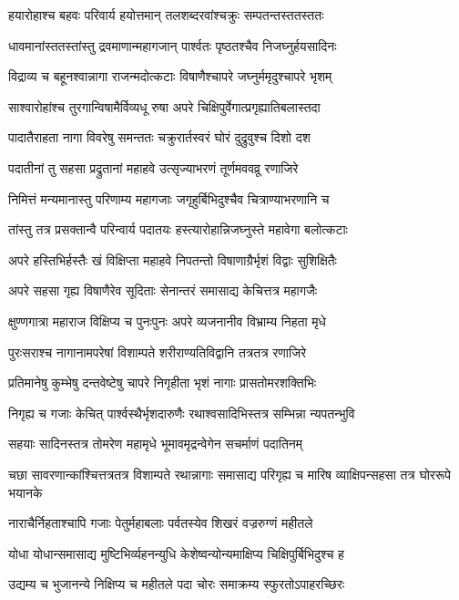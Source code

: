 \twolineshloka
{हयारोहाश्च बहवः परिवार्य हयोत्तमान्}
{तलशब्दरवांश्चक्रुः सम्पतन्तस्ततस्ततः}


\twolineshloka
{धावमानांस्ततस्तांस्तु द्रवमाणान्महागजान्}
{पार्श्वतः पृष्ठतश्चैव निजघ्नुर्हयसादिनः}


\twolineshloka
{विद्राव्य च बहूनश्वान्नागा राजन्मदोत्कटाः}
{विषाणैश्चापरे जघ्नुर्ममृदुश्चापरे भृशम्}


\twolineshloka
{साश्वारोहांश्च तुरगान्विषामैर्विव्यधू रुषा}
{अपरे चिक्षिपुर्वेगात्प्रगृह्यातिबलास्तदा}


\twolineshloka
{पादातैराहता नागा विवरेषु समन्ततः}
{चक्रुरार्तस्वरं घोरं दुद्रुवुश्च दिशो दश}


\twolineshloka
{पदातीनां तु सहसा प्रद्रुतानां महाहवे}
{उत्सृज्याभरणं तूर्णमववव्रू रणाजिरे}


\twolineshloka
{निमित्तं मन्यमानास्तु परिणाम्य महागजाः}
{जगृहुर्बिभिदुश्चैव चित्राण्याभरणानि च}


\twolineshloka
{तांस्तु तत्र प्रसक्तान्वै परिन्वार्य पदातयः}
{हस्त्यारोहान्निजघ्नुस्ते महावेगा बलोत्कटाः}


\twolineshloka
{अपरे हस्तिभिर्हस्तैः खं विक्षिप्ता महाहवे}
{निपतन्तो विषाणाग्रैर्भृशं विद्वाः सुशिक्षितैः}


\twolineshloka
{अपरे सहसा गृह्य विषाणैरेव सूदिताः}
{सेनान्तरं समासाद्य केचित्तत्र महागजैः}


\twolineshloka
{क्षुण्णगात्रा महाराज विक्षिप्य च पुनःपुनः}
{अपरे व्यजनानीव विभ्राम्य निहता मृधे}


\twolineshloka
{पुरःसराश्च नागानामपरेषां विशाम्पते}
{शरीराण्यतिविद्वानि तत्रतत्र रणाजिरे}


\twolineshloka
{प्रतिमानेषु कुम्भेषु दन्तवेष्टेषु चापरे}
{निगृहीता भृशं नागाः प्रासतोमरशक्तिभिः}


\twolineshloka
{निगृह्य च गजाः केचित् पार्श्वस्थैर्भृशदारुणैः}
{रथाश्वसादिभिस्तत्र सम्भिन्ना न्यपतन्भुवि}


\twolineshloka
{सहयाः सादिनस्तत्र तोमरेण महामृधे}
{भूमावमृद्रन्वेगेन सचर्माणं पदातिनम्}


\threelineshloka
{चछा सावरणान्कांश्चित्तत्रतत्र विशाम्पते}
{रथान्नागाः समासाद्य परिगृह्य च मारिष}
{व्याक्षिपन्सहसा तत्र घोररूपे भयानके}


\twolineshloka
{नाराचैर्निहताश्चापि गजाः पेतुर्महाबलाः}
{पर्वतस्येव शिखरं वज्ररुग्णं महीतले}


\twolineshloka
{योधा योधान्समासाद्य मुष्टिभिर्व्यहनन्युधि}
{केशेष्वन्योन्यमाक्षिप्य चिक्षिपुर्बिभिदुश्च ह}


\twolineshloka
{उद्यम्य च भुजानन्ये निक्षिप्य च महीतले}
{पदा चोरः समाक्रम्य स्फुरतोऽपाहरच्छिरः}



